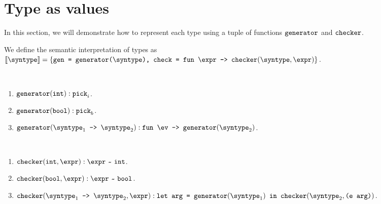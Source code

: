 \section{Type as values}

In this section, we will demonstrate how to represent each type using a tuple of functions $\texttt{generator}$ and $\texttt{checker}$.

\begin{definition}
  \label{def_typeAsVal}
  We define the semantic interpretation of types as $\llbracket \syntype \rrbracket = \{\texttt{gen = \mkgen{\syntype}, check = }\mkfunv{\expr}{\mkche{\syntype}{\expr}}\}$.
\end{definition}

\begin{definition}
  \label{def_genCore}
  \ \par 
  \begin{enumerate}
    \item $\texttt{generator}(\texttt{int}) : \texttt{pick}_i$.
    \item $\texttt{generator}(\texttt{bool}) : \texttt{pick}_b$.
    \item $\mkgen{\mkfun{\syntype_1}{\syntype_2}} : \mkfunv{\ev}{\mkgen{\syntype_2}}$.
  \end{enumerate}
\end{definition}

\begin{definition}
  \label{def_CheCore}
  \ \par 
  \begin{enumerate}
    \item $\mkche{\tint}{\expr} : \matches{\expr}{\tint}$.
    \item $\mkche{\tbool}{\expr} : \matches{\expr}{\tbool}$.
    \item $\mkche{\mkfun{\syntype_1}{\syntype_2}}{\expr} : \texttt{let arg = }\mkgen{\syntype_1} \texttt{ in }\mkche{\syntype_2}{\texttt{(e arg)}}$.
  \end{enumerate}
\end{definition}


